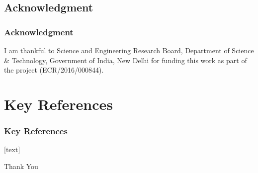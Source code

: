\documentclass [9pt,times] {beamer}
\begin{document}
\subsection*{Acknowledgment}\label{Ack}
\begin{frame}\frametitle{Acknowledgment}
\justifying
\fontsize{8pt}{10pt}\selectfont
\textcolor[rgb]{1.00,0.00,0.00}{I am thankful to}
 Science and Engineering Research Board, Department of Science \& Technology, Government of India, New Delhi for funding this work as part of the project (ECR/2016/000844).

%
\end{frame}

\section{Key References}\label{ref}

\footnotesize


\begin{frame}[allowframebreaks]\frametitle{Key References}
\fontsize{5pt}{7pt}\selectfont
{}[text]

\renewcommand{\bibname}{KEY REFERENCES}

\end{frame}


\begin{frame}
\transdissolve
\rm
\begin{center}
\Huge{Thank You}
\end{center}
\end{frame}
\end{document}
